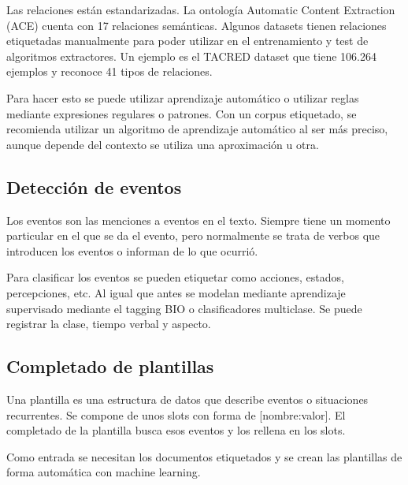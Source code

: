Las relaciones están estandarizadas. La ontología Automatic Content Extraction (ACE) cuenta con 17 relaciones semánticas.
Algunos datasets tienen relaciones etiquetadas manualmente para poder utilizar en el entrenamiento y test de algoritmos extractores. Un ejemplo es el TACRED dataset que tiene 106.264 ejemplos y reconoce 41 tipos de relaciones.  

Para hacer esto se puede utilizar aprendizaje automático o utilizar reglas mediante expresiones regulares o patrones. Con un corpus etiquetado, se recomienda utilizar un algoritmo de aprendizaje automático al ser más preciso, aunque depende del contexto se utiliza una aproximación u otra. 

\subsection{Detección de eventos}
Los eventos son las menciones a eventos en el texto. Siempre tiene un momento particular en el que se da el evento, pero normalmente se trata de verbos que introducen los eventos o informan de lo que ocurrió. 

Para clasificar los eventos se pueden etiquetar como acciones, estados, percepciones, etc. Al igual que antes se modelan mediante aprendizaje supervisado mediante el tagging BIO o clasificadores multiclase. Se puede registrar la clase, tiempo verbal y aspecto. 

\subsection{Completado de plantillas}
Una plantilla es una estructura de datos que describe eventos o situaciones recurrentes. Se compone de unos slots con forma de [nombre:valor]. El completado de la plantilla busca esos eventos y los rellena en los slots. 

Como entrada se necesitan los documentos etiquetados y se crean las plantillas de forma automática con machine learning. 